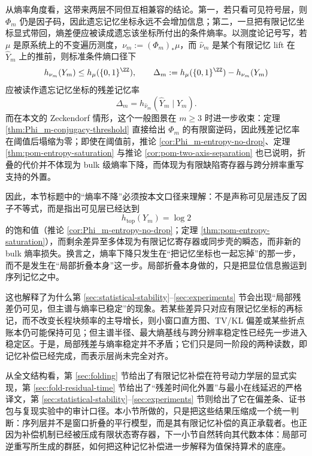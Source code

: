 从熵率角度看，这带来两层不同但互相兼容的结论。第一，若只看可见符号层，则 \(\Phi_m\) 仍是因子码，因此遗忘记忆坐标永远不会增加信息；第二，一旦把有限记忆坐标显式带回，熵差便应被读成遗忘该坐标所付出的条件熵率。以测度论记号写，若 \(\mu\) 是原系统上的不变遍历测度，\(\nu_m:=(\Phi_m)_*\mu\)，而 \(\widehat\nu_m\) 是某个有限记忆 lift 在 \(\widehat Y_m\) 上的推前，则标准条件熵口径下
\[
h_{\nu_m}(Y_m)\le h_\mu(\{0,1\}^{\ZZ}),
\qquad
\Delta_m:=h_\mu(\{0,1\}^{\ZZ})-h_{\nu_m}(Y_m)
\]
应被读作遗忘记忆坐标的残差记忆率
\[
\Delta_m
=
h_{\widehat\nu_m}\!\left(\widehat Y_m\mid Y_m\right).
\]
而在本文的 Zeckendorf 情形，这个一般图景在 \(m\ge 3\) 时进一步收束：定理 \ref{thm:Phi_m-conjugacy-threshold} 直接给出 \(\Phi_m\) 的有限窗逆码，因此残差记忆率在阈值后塌缩为零；即使在阈值前，推论 \ref{cor:Phi_m-entropy-no-drop}、定理 \ref{thm:pom-entropy-saturation} 与推论 \ref{cor:pom-two-axis-separation} 也已说明，折叠的代价并不体现为 bulk 级熵率下降，而体现为有限缺陷寄存器与跨分辨率重写支持的外置。

因此，本节标题中的“熵率不降”必须按本文口径来理解：不是声称可见层违反了因子不等式，而是指出可见层已经达到
\[
h_{\mathrm{top}}(Y_m)=\log 2
\]
的饱和值（推论 \ref{cor:Phi_m-entropy-no-drop}；定理 \ref{thm:pom-entropy-saturation}），而剩余差异至多体现为有限记忆寄存器或同步壳的瞬态，而非新的 bulk 熵率损失。换言之，熵率下降只发生在“把记忆坐标也一起忘掉”的那一步，而不是发生在“局部折叠本身”这一步。局部折叠本身做的，只是把显位信息搬运到序列记忆之中。

这也解释了为什么第 \ref{sec:statistical-stability}--\ref{sec:experiments} 节会出现“局部残差仍可见，但主谱与熵率已稳定”的现象。若某些差异只对应有限记忆坐标的再标记，而不改变长程块频率的主导增长，则小窗口直方图、TV/KL 偏差或某些折点账本仍可能保持可见；但主谱半径、最大熵基线与跨分辨率稳定性已经先一步进入稳定区。于是，局部残差与熵率稳定并不矛盾；它们只是同一阶段的两种读数，即记忆补偿已经完成，而表示层尚未完全对齐。

从全文结构看，第 \ref{sec:folding} 节给出了有限记忆补偿在符号动力学层的显式实现，第 \ref{sec:fold-residual-time} 节给出了“残差时间化外置”与最小在线延迟的严格译文，第 \ref{sec:statistical-stability}--\ref{sec:experiments} 节则给出了它在偏差条、证书包与复现实验中的审计口径。本小节所做的，只是把这些结果压缩成一个统一判断：序列层并不是窗口折叠的平行模型，而是其有限记忆补偿的真正承载者。也正因为补偿机制已经被压成有限状态寄存器，下一小节自然转向其代数本体：局部可逆重写所生成的群胚，如何把这种记忆补偿进一步解释为值保持算术的底座。
